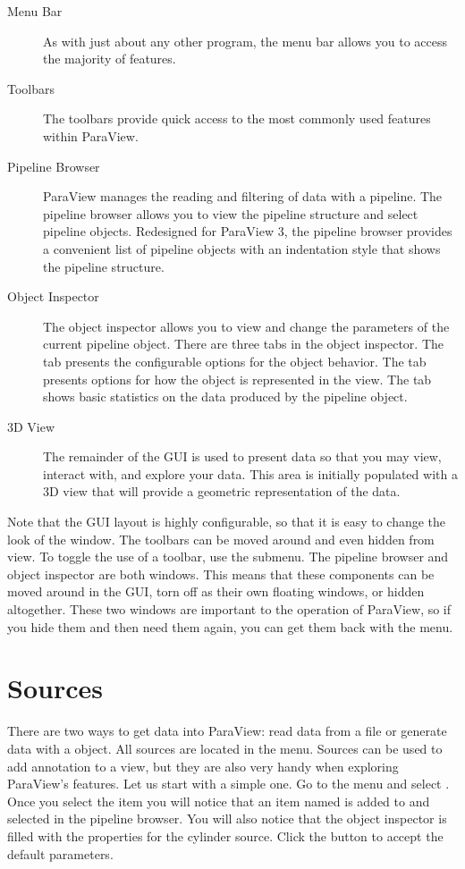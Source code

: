 \begin{description}
\item[Menu Bar]  As with just about any other program, the
  menu bar allows you to access the majority of features.
\item[Toolbars]  The toolbars provide quick access to the
  most commonly used features within ParaView.
\item[Pipeline Browser]  ParaView manages the
  reading and filtering of data with a pipeline.  The pipeline browser
  allows you to view the pipeline structure and select pipeline objects.
  Redesigned for ParaView 3, the pipeline browser provides a convenient
  list of pipeline objects with an indentation style that shows the
  pipeline structure.
\item[Object Inspector]  The object inspector
  allows you to view and change the parameters of the current pipeline
  object.  There are three tabs in the object inspector.  The
   tab presents the configurable options for the object
  behavior.  The  tab presents options for how the object
  is represented in the view.  The  tab shows basic
  statistics on the data produced by the pipeline object.
\item[3D View]  The remainder of the GUI is used to present
  data so that you may view, interact with, and explore your data.  This
  area is initially populated with a 3D view that will provide a geometric
  representation of the data.
\end{description}

Note that the GUI layout is highly configurable, so that it is easy to
change the look of the window.  The toolbars can be moved around and even
hidden from view.  To toggle the use of a toolbar, use the  \ra
{} submenu.  The pipeline browser and object inspector are both
 windows.  This means that these components can be moved
around in the GUI, torn off as their own floating windows, or hidden
altogether.  These two windows are important to the operation of ParaView,
so if you hide them and then need them again, you can get them back with
the  menu.


\section{Sources}

There are two ways to get data into ParaView: read data from a file or
generate data with a  object.  All sources are located in
the  menu.  Sources can be used to add annotation to a view,
but they are also very handy when exploring ParaView’s features.  Let us
start with a simple one.  Go to the  menu and select
.  Once you select the  item you will notice
that an item named  is added to and selected in the
pipeline browser.  You will also notice that the object inspector is filled
with the properties for the cylinder source.  Click the  button
\apply to accept the default parameters.

